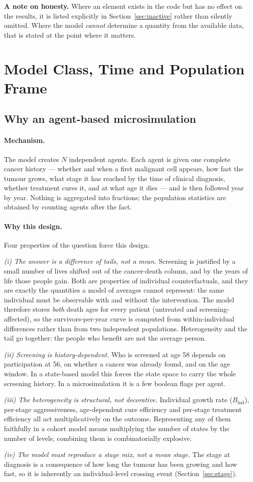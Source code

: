 \documentclass[12pt,a4paper]{article}
\newcommand{\mech}[1]{\paragraph{Mechanism.} #1}
\newcommand{\why}[1]{\paragraph{Why this design.} #1}
\begin{document}
\textbf{A note on honesty.} Where an element exists in the code but has no effect on the results, it is
listed explicitly in Section~\ref{sec:inactive} rather than silently omitted. Where the model
\emph{cannot} determine a quantity from the available data, that is stated at the point where it
matters.

\section{Model Class, Time and Population Frame}

\subsection{Why an agent-based microsimulation}

\mech{The model creates $N$ independent agents. Each agent is given one complete cancer history ---
whether and when a first malignant cell appears, how fast the tumour grows, what stage it has reached by
the time of clinical diagnosis, whether treatment cures it, and at what age it dies --- and is then
followed year by year. Nothing is aggregated into fractions; the population statistics are obtained by
counting agents after the fact.}

\why{Four properties of the question force this design.

\emph{(i) The answer is a difference of tails, not a mean.} Screening is justified by a small number of
lives shifted out of the cancer-death column, and by the years of life those people gain. Both are
properties of individual counterfactuals, and they are exactly the quantities a model of averages cannot
represent: the same individual must be observable with and without the intervention. The model therefore
stores \emph{both} death ages for every patient (untreated and screening-affected), so the survivors-per-year
curve is computed from within-individual differences rather than from two independent populations.
Heterogeneity and the tail go together: the people who benefit are not the average person.

\emph{(ii) Screening is history-dependent.} Who is screened at age 58 depends on participation at 56, on
whether a cancer was already found, and on the age window. In a state-based model this forces the state
space to carry the whole screening history. In a microsimulation it is a few boolean flags per agent.

\emph{(iii) The heterogeneity is structural, not decorative.} Individual growth rate
($B_{\text{ind}}$), per-stage aggressiveness, age-dependent cure efficiency and per-stage treatment
efficiency all act multiplicatively on the outcome. Representing any of them faithfully in a cohort model
means multiplying the number of states by the number of levels; combining them is combinatorially
explosive.

\emph{(iv) The model must reproduce a stage mix, not a mean stage.} The stage at diagnosis is a
consequence of how long the tumour has been growing and how fast, so it is inherently an individual-level
crossing event (Section~\ref{sec:stage}).}
\end{document}
